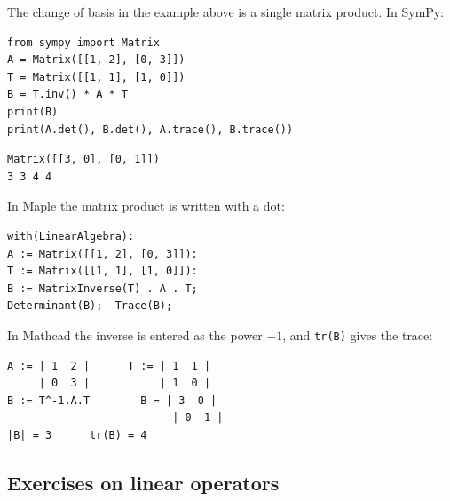 The change of basis in the example above is a single matrix product. In SymPy:
\begin{Verbatim}[fontsize=\footnotesize,frame=single,label={\small Python}]
from sympy import Matrix
A = Matrix([[1, 2], [0, 3]])
T = Matrix([[1, 1], [1, 0]])
B = T.inv() * A * T
print(B)
print(A.det(), B.det(), A.trace(), B.trace())
\end{Verbatim}
\begin{Verbatim}[fontsize=\footnotesize,frame=single,label={\small Output}]
Matrix([[3, 0], [0, 1]])
3 3 4 4
\end{Verbatim}
In Maple the matrix product is written with a dot:
\begin{Verbatim}[fontsize=\footnotesize,frame=single,label={\small Maple}]
with(LinearAlgebra):
A := Matrix([[1, 2], [0, 3]]):
T := Matrix([[1, 1], [1, 0]]):
B := MatrixInverse(T) . A . T;
Determinant(B);  Trace(B);
\end{Verbatim}
In Mathcad the inverse is entered as the power $-1$, and \texttt{tr(B)} gives the trace:
\begin{Verbatim}[fontsize=\footnotesize,frame=single,label={\small Mathcad}]
A := | 1  2 |      T := | 1  1 |
     | 0  3 |           | 1  0 |
B := T^-1.A.T        B = | 3  0 |
                          | 0  1 |
|B| = 3      tr(B) = 4
\end{Verbatim}

\subsection{Exercises on linear operators}

